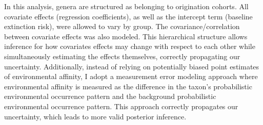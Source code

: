 \documentclass[12pt,letterpaper]{article}
\begin{document}
In this analysis, genera are structured as belonging to origination cohorts. All covariate effects (regression coefficients), as well as the intercept term (baseline extinction risk), were allowed to vary by group. The covariance/correlation between covariate effects was also modeled. This hierarchical structure allows inference for how covariates effects may change with respect to each other while simultaneously estimating the effects themselves, correctly propagating our uncertainty. Additionally, instead of relying on potentially biased point estimates of environmental affinity, I adopt a measurement error modeling approach where environmental affinity is measured as the difference in the taxon's probabilistic environmental occurrence pattern and the background probabilistic environmental occurrence pattern. This approach correctly propagates our uncertainty, which leads to more valid posterior inference. 
\end{document}
